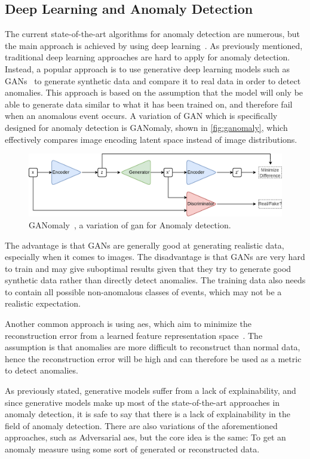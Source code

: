 \subsection{Deep Learning and Anomaly Detection}
\label{sec:dl_anom_detection}
The current state-of-the-art algorithms for anomaly detection are numerous, but the main approach is achieved by using deep learning~\cite{anomaly_detection}. As previously mentioned, traditional deep learning approaches are hard to apply for anomaly detection. Instead, a popular approach is to use generative deep learning models such as GANs~\cite{anomaly_detection, ganomaly,anomalyvideo} to generate synthetic data and compare it to real data in order to detect anomalies. This approach is based on the assumption that the model will only be able to generate data similar to what it has been trained on, and therefore fail when an anomalous event occurs. A variation of GAN which is specifically designed for anomaly detection is GANomaly\cite{ganomaly}, shown in \autoref{fig:ganomaly}, which effectively compares image encoding latent space instead of image distributions.
\begin{figure}[H]
    \centering
    \includegraphics[width=\linewidth]{resources/related_works/ganomaly}
    \caption[GANomaly Visualization]{GANomaly~\cite{ganomaly}, a variation of \gls*{gan} for Anomaly detection.}
    \label{fig:ganomaly}
\end{figure}
The advantage is that GANs are generally good at generating realistic data, especially when it comes to images. The disadvantage is that GANs are very hard to train and may give suboptimal results given that they try to generate good synthetic data rather than directly detect anomalies. The training data also needs to contain all possible non-anomalous classes of events, which may not be a realistic expectation.
\par

Another common approach is using \glspl*{ae}, which aim to minimize the reconstruction error from a learned feature representation space~\cite{autoencoder1,anomaly_detection,anomalyvideo}. The assumption is that anomalies are more difficult to reconstruct than normal data, hence the reconstruction error will be high and can therefore be used as a metric to detect anomalies.
\par
As previously stated, generative models suffer from a lack of explainability, and since generative models make up most of the state-of-the-art approaches in anomaly detection, it is safe to say that there is a lack of explainability in the field of anomaly detection. There are also variations of the aforementioned approaches, such as Adversarial \glspl*{ae}, but the core idea is the same: To get an anomaly measure using some sort of generated or reconstructed data.
